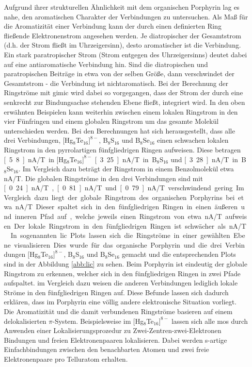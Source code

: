 Aufgrund ihrer strukturellen Ähnlichkeit mit dem organischen Porphyrin lag es nahe, den aromatischen Charakter der Verbindungen zu untersuchen. Als Maß für die Aromatizität einer Verbindung kann der durch einen definierten Ring fließende Elektronenstrom angesehen werden. Je diatropischer der Gesamtstrom (d.h. der Strom fließt im Uhrzeigersinn), desto aromatischer ist die Verbindung. Ein stark paratropischer Strom (Strom entgegen des Uhrzeigersinns) deutet dabei auf eine antiaromatische Verbindung hin. Sind die diatropischen und paratropischen Beiträge in etwa von der selben Größe, dann verschwindet der Gesamtstrom - die Verbindung ist nichtaromatisch. Bei der Berechnung der Ringströme mit \ac{gimic} wird dabei so vorgegangen, dass der Strom der durch eine senkrecht zur Bindungsachse stehenden Ebene fließt, integriert wird. In den oben erwähnten Beispielen kann weiterhin zwischen einem lokalen Ringstrom in den vier Fünfringen und einem globalen Ringstrom um das gesamte Molekül unterschieden werden. Bei den Berechnungen hat sich herausgestellt, dass alle drei Verbindungen, $[$Hg$_8$Te$_{16}]^{8-}$, B$_8$S$_{16}$ und B$_8$Se$_{16}$ einen schwachen lokalen Ringstrom in den pyrrolartigen fünfgliedrigen Ringen aufweisen. Diese betragen \unit[5.8]{nA/T} in $[$Hg$_8$Te$_{16}]^{8-}$ \unit[3.25]{nA/T} in B$_8$S$_{16}$ und \unit[3.28]{nA/T} in B$_8$Se$_{16}$. Im Vergleich dazu beträgt der Ringstrom in einem Benzolmolekül etwa \unit[12]{nA/T}\supercite{fliegl2012aromatic}. Die globalen Ringströme in den drei Verbindungen sind mit \unit[0.24]{nA/T}, \unit[0.81]{nA/T} und \unit[0.79]{nA/T} verschwindend gering. Im Vergleich dazu liegt der globale Ringstrom des organischen Porphyrins bei etwa \unit[27]{nA/T}. Dieser spaltet sich in den fünfgliedrigen Ringen in einen äußeren und inneren Pfad auf, welche jeweils einen Ringstrom von etwa \unit[13]{nA/T} aufweisen. Der lokale Ringstrom in den fünfgliedrigen Ringen ist schwächer als \unit[1]{nA/T}.\supercite{fliegl2012aromatic} In sogenannten \ac{lic} Plots lassen sich die Ringströme in einer gewählten Ebene visualisieren. Dies wurde für das organische Porphyrin und die drei Verbindungen $[$Hg$_8$Te$_{16}]^{8-}$, B$_8$S$_{16}$ und B$_8$Se$_{16}$ gemacht und die entsprechenden Plots sind in der Abbildung \ref{abb:lic} zu sehen. Beim Porphyrin ist eindeutig der globale Ringstrom zu erkennen, welcher sich in den fünfgliedrigen Ringen in zwei Pfade aufspaltet. im Vergleich dazu weisen die anderen Verbindungen lediglich lokale Ströme in den fünfgliedrigen Ringen auf.
Diese Befunde lassen sich dadurch erklären, dass im Porphyrin eine völlig andere elektronische Situation vorliegt. Die Aromatizität und die damit verbundenen Ringströme basieren auf einem delokalisierten $\pi$-System. Beispielsweise im $[$Hg$_8$Te$_{16}]^{8-}$ lassen sich alle \acp{mo} durch Anwenden einer Lokalisierungsprozedur\supercite{boys1960sf} zu Zwei-Zentren-zwei-Elektronen Bindungen und freien Elektronenpaaren lokalisieren. Dabei werden s-artige Einfachbindungen zwischen den benachbarten Atomen und zwei freie Elektronenpaare pro Telluratom erhalten. 

